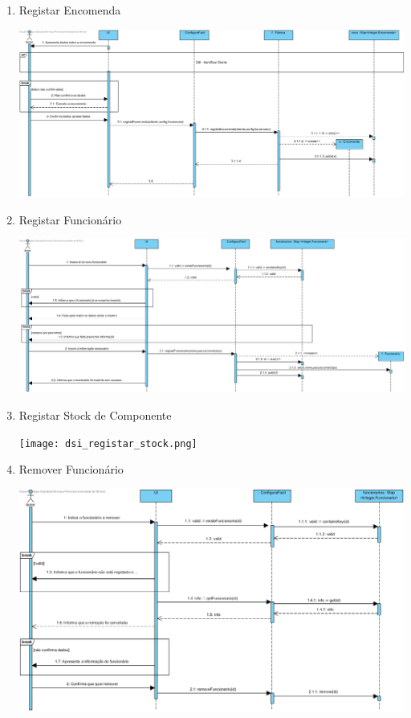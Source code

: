 \documentclass[11pt]{article} %
\begin{document}
\begin{enumerate}
\begin{center}
		\end{center}
	\item Registar Encomenda
		\begin{center}
 			\includegraphics[width = 6in]{dsi_registar_encomenda.png}
		\end{center}
	\item Registar Funcionário
		\begin{center}
 			\includegraphics[width = 6in]{dsi_registar_funcionario.png}
		\end{center}
	\item Registar Stock de Componente
		\begin{center}
 			\texttt{[image: dsi\_registar\_stock.png]}
		\end{center}
	\item Remover Funcionário
		\begin{center}
 			\includegraphics[width = 6in]{dsi_remover_funcionario.png}
		\end{center}
\end{enumerate}
\end{document}
